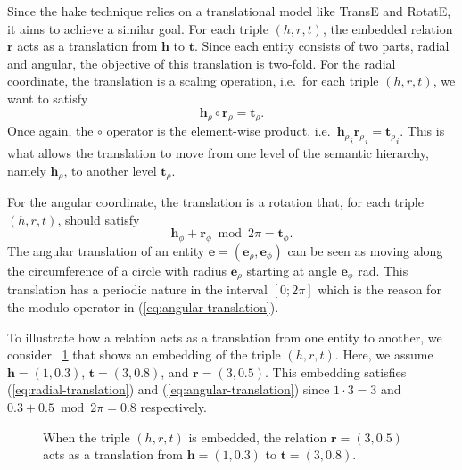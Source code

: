 Since the \ac{hake} technique relies on a translational model like TransE and RotatE, it aims to achieve a similar goal.
For each triple $(h, r, t)$, the embedded relation $\bm{r}$ acts as a translation from $\bm{h}$ to $\bm{t}$.
Since each entity consists of two parts, radial and angular, the objective of this translation is two-fold.
For the radial coordinate, the translation is a scaling operation, i.e.\ for each triple $(h, r, t)$, we want to satisfy
\begin{equation}\label{eq:radial-translation}
  \bm{h}_\rho \circ \bm{r}_\rho = \bm{t}_\rho.
\end{equation}
Once again, the $\circ$ operator is the element-wise product, i.e.\ ${\bm{h}_\rho}_i{\bm{r}_\rho}_i = {\bm{t}_\rho}_i$.
This is what allows the translation to move from one level of the semantic hierarchy, namely $\bm{h}_\rho$, to another level $\bm{t}_\rho$.

For the angular coordinate, the translation is a rotation that, for each triple $(h, r, t)$, should satisfy
\begin{equation}\label{eq:angular-translation}
  \bm{h}_\phi + \bm{r}_\phi \bmod{2\pi} = \bm{t}_\phi.
\end{equation}
The angular translation of an entity $\bm{e} = (\bm{e}_\rho, \bm{e}_\phi)$ can be seen as moving along the circumference of a circle with radius $\bm{e}_\rho$ starting at angle $\bm{e}_\phi$ \si{\radian}.
This translation has a periodic nature in the interval $[0;2\pi]$ which is the reason for the modulo operator in (\ref{eq:angular-translation}).

\begin{example}\label{ex:translation}
  To illustrate how a relation acts as a translation from one entity to another, we consider \figurename~\ref{fig:translation} that shows an embedding of the triple $(h, r, t)$.
  Here, we assume $\bm{h} = (1, 0.3)$, $\bm{t} = (3, 0.8)$, and $\bm{r} = (3, 0.5)$.
  This embedding satisfies (\ref{eq:radial-translation}) and (\ref{eq:angular-translation}) since $1 \cdot 3 = 3$ and $0.3 + 0.5 \bmod 2\pi = 0.8$ respectively.

  \begin{figure}[ht]
    \centering\small
    
    \caption{When the triple $(h, r, t)$ is embedded, the relation $\bm{r} = (3, 0.5)$ acts as a translation from $\bm{h} = (1, 0.3)$ to $\bm{t} = (3, 0.8)$.}\label{fig:translation}
  \end{figure}
\end{example}

